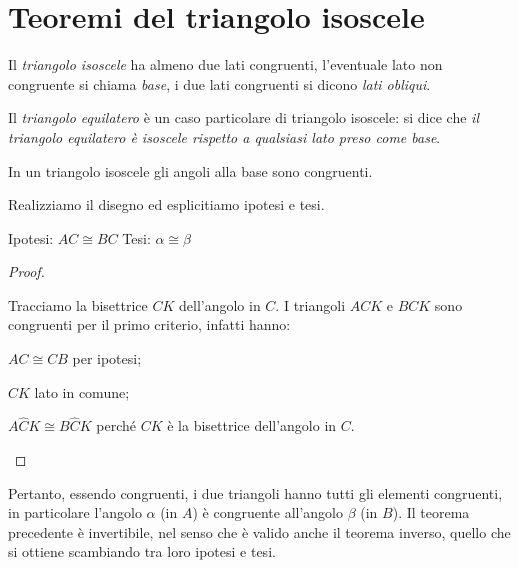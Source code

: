 \section{Teoremi del triangolo isoscele}
\label{sect:teoremi_triangolo_isoscele}

Il \emph{triangolo isoscele} ha almeno due lati congruenti, 
l'eventuale lato non congruente si chiama \emph{base}, i due lati 
congruenti si dicono \emph{lati obliqui}.

Il \emph{triangolo equilatero} è un caso particolare di triangolo 
isoscele: si dice che \emph{il triangolo equilatero è isoscele 
rispetto a qualsiasi lato preso come base}.

\begin{teorema}
In un triangolo isoscele gli angoli alla base sono congruenti.
\end{teorema}

Realizziamo il disegno ed esplicitiamo ipotesi e tesi.

\noindent Ipotesi: $AC\cong BC$
\tab Tesi: $\alpha\cong \beta$

\begin{proof}
\begin{multicols}{2}
Tracciamo la bisettrice $CK$ dell'angolo in $C$.
I triangoli $ACK$ e $BCK$ sono congruenti per il primo criterio, 
infatti hanno:
\begin{itemize*}
\item $AC\cong CB$ per ipotesi;
\item $CK$ lato in comune;
\item $A\widehat{C}K\cong B\widehat{C}K$ perché $CK$ è la bisettrice 
dell'angolo in $C$.
\end{itemize*}
\begin{center}
\begin{inaccessibleblock}

\end{inaccessibleblock}
\end{center}
\end{multicols}
\end{proof}

Pertanto, essendo congruenti, i due triangoli hanno tutti gli 
elementi congruenti, in particolare l'angolo $\alpha$ (in $A$) è 
congruente all'angolo $\beta$ (in $B$).
Il teorema precedente è invertibile, nel senso che è valido anche il 
teorema inverso, quello che si ottiene scambiando tra loro ipotesi e 
tesi.

